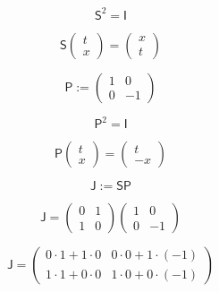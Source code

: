 \documentclass[12pt]{article}
\begin{document}
\begin{equation}
\mathsf{S}^2=\mathsf{I}
\end{equation}

\begin{equation}
\mathsf{S}\begin{pmatrix}t\\[2pt]x\end{pmatrix}=\begin{pmatrix}x\\[2pt]t\end{pmatrix}
\end{equation}

\begin{equation}
\mathsf{P}:=\begin{pmatrix}1&0\\[2pt]0&-1\end{pmatrix}
\end{equation}

\begin{equation}
\mathsf{P}^2=\mathsf{I}
\end{equation}

\begin{equation}
\mathsf{P}\begin{pmatrix}t\\[2pt]x\end{pmatrix}=\begin{pmatrix}t\\[2pt]-x\end{pmatrix}
\end{equation}

\begin{equation}
\mathsf{J}:=\mathsf{S}\mathsf{P}
\end{equation}

\begin{equation}
\mathsf{J}=\begin{pmatrix}0&1\\[2pt]1&0\end{pmatrix}\begin{pmatrix}1&0\\[2pt]0&-1\end{pmatrix}
\end{equation}

\begin{equation}
\mathsf{J}=\begin{pmatrix}0\cdot1+1\cdot0&0\cdot0+1\cdot(-1)\\[2pt]1\cdot1+0\cdot0&1\cdot0+0\cdot(-1)\end{pmatrix}
\end{equation}
\end{document}
